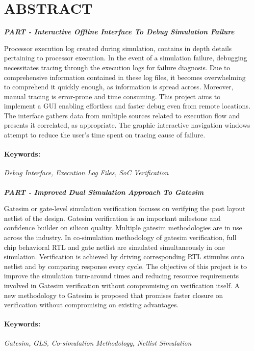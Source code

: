 \section*{\centering ABSTRACT}
\newcommand{\RNum}[1]{\uppercase\expandafter{\romannumeral #1\relax}}


\centerline{\emph{\bf PART \RNum{1}- Interactive Offline Interface To Debug Simulation Failure }}
\vspace{5pt}
Processor execution log created during simulation, contains in depth details pertaining to processor execution.  In the event of a simulation failure, debugging necessitates tracing through the execution logs for failure diagnosis.  Due to comprehensive information contained in these log files, it becomes overwhelming to comprehend it quickly enough, as information is spread across. Moreover, manual tracing is error-prone and time consuming.
This project aims to implement a GUI  enabling effortless and faster debug even from remote locations. The interface gathers data from multiple sources related to execution flow and presents it correlated, as appropriate. The graphic interactive navigation windows attempt to reduce the user's time spent on tracing cause of failure.



\paragraph{Keywords:}
 \emph{Debug Interface, Execution Log Files, SoC  Verification}


 \paragraph{}

\centerline{\emph{\bf PART \RNum{2}- Improved Dual Simulation Approach To Gatesim}}
\vspace{5pt}
Gatesim or gate-level simulation verification focuses on verifying the post layout netlist of the design. Gatesim verification is an important milestone and confidence builder on silicon quality. Multiple gatesim methodologies are in use across the industry. In co-simulation methodology of gatesim verification, full chip behavioral RTL  and gate netlist are simulated simultaneously in one simulation. Verification is achieved by driving corresponding RTL stimulus onto netlist and by comparing response every cycle.
The objective of this project is to improve the simulation turn-around times and reducing resource requirements involved in Gatesim verification without compromising on verification itself. A new methodology to Gatesim is proposed that promises faster closure on verification without compromising on existing advantages.


\paragraph{Keywords:}
 \emph{Gatesim,  GLS,  Co-simulation Methodology, Netlist Simulation}




